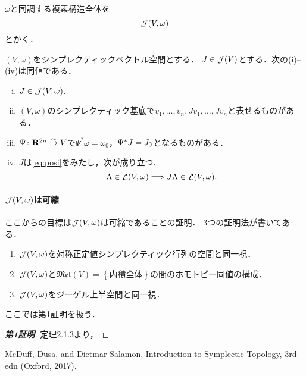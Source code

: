 \(\omega\)と同調する複素構造全体を
\[
    \mathop{\mathcal{J}}(V,\omega)
\]
とかく．
\setcounter{AXM}{3}
\begin{leftbar}
\begin{PRP}
    \((V,\omega)\)をシンプレクティックベクトル空間とする．
    \(J\in\mathop{\mathcal{J}}(V)\)とする．次の(i)--(iv)は同値である．
    \begin{enumerate}[(i)]
        \item \(J\in\mathop{\mathcal{J}}(V,\omega)\). 
        \item \((V,\omega)\)のシンプレクティック基底で\(v_1,\dots,v_n,Jv_1,\dots,Jv_n\)と表せるものがある．
        \item \(\Psi\colon \mathbf{R}^{2n}\mathrel{\overset{\sim}{\rightarrow}} V\)で\(\Psi^\ast\omega=\omega_0\)，\(\Psi^\ast J=\mathord{J_0}\)となるものがある．
        \item \(J\)は\eqref{eq:posi}をみたし，次が成り立つ．\begin{equation}
            \Lambda\in\mathop{\mathcal{L}}(V,\omega)
            \Longrightarrow
            J\Lambda\in\mathop{\mathcal{L}}(V,\omega).
        \end{equation}
    \end{enumerate}
\end{PRP}
\end{leftbar}

\paragraph{\(\mathop{\mathcal{J}}(V,\omega)\)は可縮}
ここからの目標は\(\mathop{\mathcal{J}}(V,\omega)\)は可縮であることの証明．
3つの証明法が書いてある．
\begin{enumerate}
    \item \(\mathop{\mathcal{J}}(V,\omega)\)を対称正定値シンプレクティック行列の空間と同一視．
    \item \(\mathop{\mathcal{J}}(V,\omega)\)と\(\mathfrak{Met}(V)=\left\{\text{内積全体}\right\}\)の間のホモトピー同値の構成．    
    \item \(\mathop{\mathcal{J}}(V,\omega)\)をジーゲル上半空間と同一視．
\end{enumerate}
ここでは第1証明を扱う．
\begin{proof}[\textbf{第1証明}]
    定理2.1.3より，
\end{proof}


\clearpage
\begin{thebibliography}{20} 
     McDuff, Dusa, 
    and Dietmar Salamon, 
    Introduction to Symplectic Topology, 
    3rd edn (Oxford, 2017).
\end{thebibliography}




